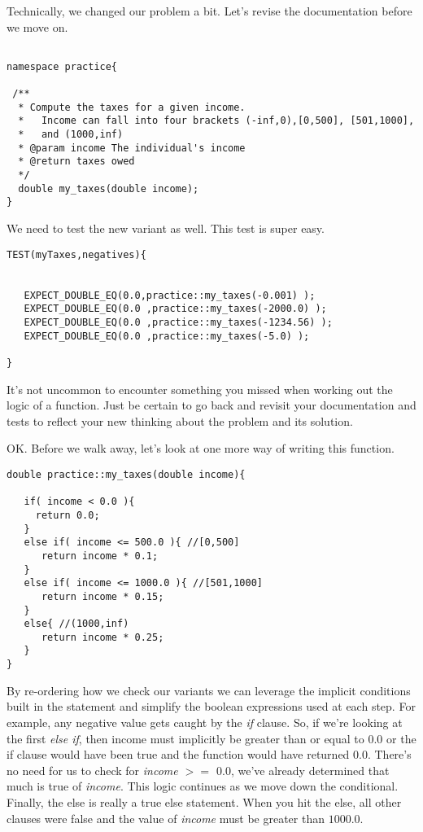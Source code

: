 \documentclass[]{tufte-handout}
\begin{document}
Technically, we changed our problem a bit. Let's revise the documentation before we move on.
\begin{verbatim}

namespace practice{

 /** 
  * Compute the taxes for a given income.
  *   Income can fall into four brackets (-inf,0),[0,500], [501,1000], 
  *   and (1000,inf)
  * @param income The individual's income 
  * @return taxes owed
  */
  double my_taxes(double income);
}
\end{verbatim}
We need to test the new variant as well. This test is super easy.
\begin{verbatim}
TEST(myTaxes,negatives){


   EXPECT_DOUBLE_EQ(0.0,practice::my_taxes(-0.001) );  
   EXPECT_DOUBLE_EQ(0.0 ,practice::my_taxes(-2000.0) );
   EXPECT_DOUBLE_EQ(0.0 ,practice::my_taxes(-1234.56) );
   EXPECT_DOUBLE_EQ(0.0 ,practice::my_taxes(-5.0) );      
   
}
\end{verbatim}

It's not uncommon to encounter something you missed when working out the logic of a function.  Just be certain to go back and revisit your documentation and tests to reflect your new thinking about the problem and its solution.


OK. Before we walk away, let's look at one more way of writing this function.
\begin{verbatim}
double practice::my_taxes(double income){

   if( income < 0.0 ){
     return 0.0;
   } 
   else if( income <= 500.0 ){ //[0,500]
      return income * 0.1;
   }
   else if( income <= 1000.0 ){ //[501,1000]
      return income * 0.15;   
   }
   else{ //(1000,inf) 
      return income * 0.25;   
   }
}
\end{verbatim}

By re-ordering how we check our variants we can leverage the implicit conditions built in the statement and simplify the boolean expressions used at each step. For example, any negative value gets caught by the \textit{if} clause. So, if we're looking at the first \textit{else if}, then income must implicitly be greater than or equal to $0.0$ or the if clause would have been true and the function would have returned $0.0$. There's no need for us to check for \textit{income $>=$ $0.0$}, we've already determined that much is true of \textit{income}. This logic continues as we move down the conditional. Finally, the else is really a true else statement.  When you hit the else, all other clauses were false and the value of \textit{income} must be greater than $1000.0$.
\end{document}
